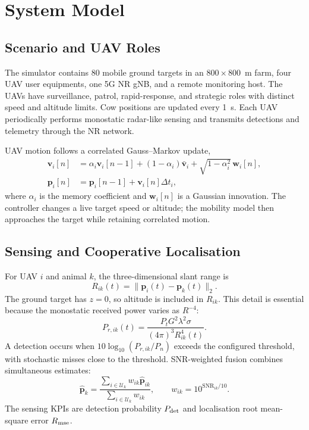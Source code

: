 \documentclass[10pt,conference]{IEEEtran}
\begin{document}
\section{System Model}

\subsection{Scenario and UAV Roles}

The simulator contains 80 mobile ground targets in an $800\times800$~m farm,
four UAV user equipments, one 5G NR gNB, and a remote monitoring host. The UAVs
have surveillance, patrol, rapid-response, and strategic roles with distinct
speed and altitude limits. Cow positions are updated every 1~s. Each UAV
periodically performs monostatic radar-like sensing and transmits detections
and telemetry through the NR network.

UAV motion follows a correlated Gauss--Markov update,
\begin{align}
\mathbf v_i[n] &= \alpha_i\mathbf v_i[n-1]
 +(1-\alpha_i)\bar{\mathbf v}_i
 +\sqrt{1-\alpha_i^2}\,\mathbf w_i[n],\\
\mathbf p_i[n] &= \mathbf p_i[n-1]+\mathbf v_i[n]\Delta t_i,
\end{align}
where $\alpha_i$ is the memory coefficient and $\mathbf w_i[n]$ is a Gaussian
innovation. The controller changes a live target speed or altitude; the
mobility model then approaches the target while retaining correlated motion.

\subsection{Sensing and Cooperative Localisation}

For UAV $i$ and animal $k$, the three-dimensional slant range is
\begin{equation}
R_{ik}(t)=\|\mathbf p_i(t)-\mathbf p_k(t)\|_2.
\end{equation}
The ground target has $z=0$, so altitude is included in $R_{ik}$. This detail is
essential because the monostatic received power varies as $R^{-4}$:
\begin{equation}
P_{r,ik}(t)=\frac{P_tG^2\lambda^2\sigma}
{(4\pi)^3R_{ik}^4(t)}.
\end{equation}
A detection occurs when $10\log_{10}(P_{r,ik}/P_n)$ exceeds the configured
threshold, with stochastic misses close to the threshold. SNR-weighted fusion
combines simultaneous estimates:
\begin{equation}
\hat{\mathbf p}_k=
\frac{\sum_{i\in\mathcal U_k}w_{ik}\hat{\mathbf p}_{ik}}
{\sum_{i\in\mathcal U_k}w_{ik}},\qquad
w_{ik}=10^{\mathrm{SNR}_{ik}/10}.
\end{equation}
The sensing KPIs are detection probability $P_{\rm det}$ and localisation root
mean-square error $R_{\rm mse}$.
\end{document}
